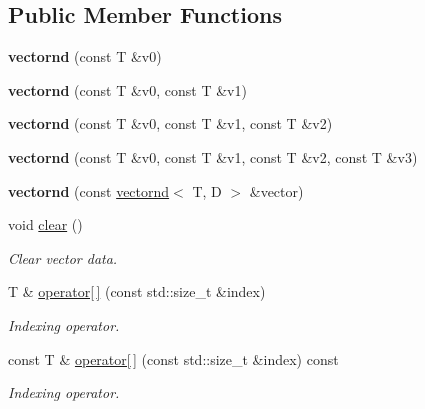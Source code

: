 \subsection*{Public Member Functions}
\begin{DoxyCompactItemize}
\item 
\mbox{\label{classacme_1_1vectornd_ab5dc63b6b6930829fd1be72fbbb3e2cb}} 
{\bfseries vectornd} (const T \&v0)
\item 
\mbox{\label{classacme_1_1vectornd_ad5b21158841bed8eef52d240ba6c892d}} 
{\bfseries vectornd} (const T \&v0, const T \&v1)
\item 
\mbox{\label{classacme_1_1vectornd_a5e1fc35ace1eb455ea043272bc7fcd39}} 
{\bfseries vectornd} (const T \&v0, const T \&v1, const T \&v2)
\item 
\mbox{\label{classacme_1_1vectornd_a71cffdc32a6e041af16fa0db477d8ec7}} 
{\bfseries vectornd} (const T \&v0, const T \&v1, const T \&v2, const T \&v3)
\item 
\mbox{\label{classacme_1_1vectornd_a990e311e894b7a8ac9954597844c2991}} 
{\bfseries vectornd} (const \hyperlink{classacme_1_1vectornd}{vectornd}$<$ T, D $>$ \&vector)
\item 
\mbox{\label{classacme_1_1pointnd_a2d0b84e609dc1ad5cbbe631c5bb5791f}} 
void \hyperlink{classacme_1_1pointnd_a2d0b84e609dc1ad5cbbe631c5bb5791f}{clear} ()
\begin{DoxyCompactList}\small\item\em Clear vector data. \end{DoxyCompactList}\item 
T \& \hyperlink{classacme_1_1pointnd_a35b0691673728d98d455c007612d6b91}{operator\mbox{[}$\,$\mbox{]}} (const std\+::size\+\_\+t \&index)
\begin{DoxyCompactList}\small\item\em Indexing operator. \end{DoxyCompactList}\item 
const T \& \hyperlink{classacme_1_1pointnd_a565e9ed195c8f8dadc570a029a3deb94}{operator\mbox{[}$\,$\mbox{]}} (const std\+::size\+\_\+t \&index) const
\begin{DoxyCompactList}\small\item\em Indexing operator. \end{DoxyCompactList}\end{DoxyCompactItemize}
